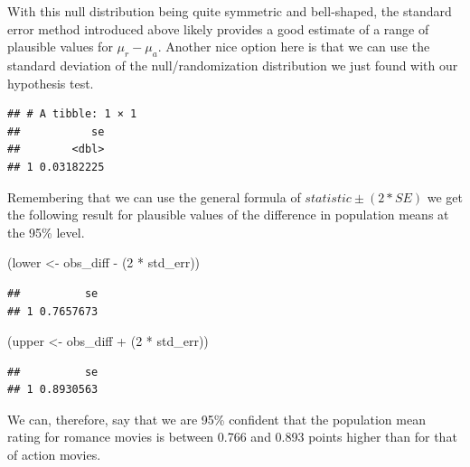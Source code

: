 \documentclass[]{tufte-book}
\newenvironment{Shaded}{\begin{snugshade}}{\end{snugshade}}
\newcommand{\KeywordTok}[1]{\textcolor[rgb]{0.13,0.29,0.53}{\textbf{{#1}}}}
\newcommand{\DataTypeTok}[1]{\textcolor[rgb]{0.13,0.29,0.53}{{#1}}}
\newcommand{\DecValTok}[1]{\textcolor[rgb]{0.00,0.00,0.81}{{#1}}}
\newcommand{\StringTok}[1]{\textcolor[rgb]{0.31,0.60,0.02}{{#1}}}
\newcommand{\NormalTok}[1]{{#1}}
\begin{document}
With this null distribution being quite symmetric and bell-shaped, the
standard error method introduced above likely provides a good estimate
of a range of plausible values for \(\mu_r - \mu_a\). Another nice
option here is that we can use the standard deviation of the
null/randomization distribution we just found with our hypothesis test.

\begin{Shaded}
\end{Shaded}

\begin{verbatim}
## # A tibble: 1 × 1
##           se
##        <dbl>
## 1 0.03182225
\end{verbatim}

Remembering that we can use the general formula of
\(statistic \pm (2 * SE)\) we get the following result for plausible
values of the difference in population means at the 95\% level.

\begin{Shaded}
\begin{Highlighting}[]
\NormalTok{(lower <-}\StringTok{ }\NormalTok{obs_diff -}\StringTok{ }\NormalTok{(}\DecValTok{2} \NormalTok{*}\StringTok{ }\NormalTok{std_err))}
\end{Highlighting}
\end{Shaded}

\begin{verbatim}
##          se
## 1 0.7657673
\end{verbatim}

\begin{Shaded}
\begin{Highlighting}[]
\NormalTok{(upper <-}\StringTok{ }\NormalTok{obs_diff +}\StringTok{ }\NormalTok{(}\DecValTok{2} \NormalTok{*}\StringTok{ }\NormalTok{std_err))}
\end{Highlighting}
\end{Shaded}

\begin{verbatim}
##          se
## 1 0.8930563
\end{verbatim}

We can, therefore, say that we are 95\% confident that the population
mean rating for romance movies is between 0.766 and 0.893 points higher
than for that of action movies.
\end{document}
